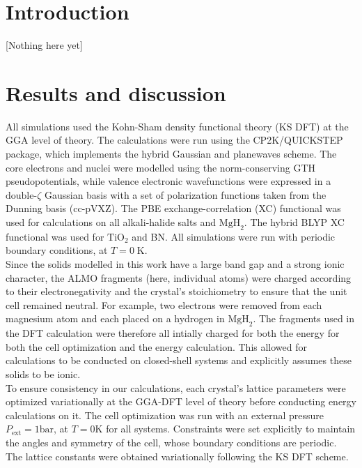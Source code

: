 \documentclass[aps,prb,twocolumn,amsmath,amssymb,superscriptaddress,longbibliography]{revtex4-1}
\begin{document}
\section{Introduction} 

[Nothing here yet]



\section*{Results and discussion}
 
All simulations used the Kohn-Sham density functional theory (KS DFT) at the GGA level of theory. 
The calculations were run using the CP2K/QUICKSTEP package\cite{cp2k}, which implements the hybrid Gaussian and planewaves scheme\cite{gpw}. 
The core electrons and nuclei were modelled using the norm-conserving GTH pseudopotentials\cite{gth1,gth2}, while valence electronic wavefunctions were expressed in a $\text{double-}\zeta$  Gaussian basis \cite{gaussian} with a set of polarization functions taken from the Dunning basis (cc-pVXZ)\cite{pol,qs}.
The PBE exchange-correlation (XC) functional\cite{pbe} was used for calculations on all alkali-halide salts and $\text{MgH}_{2}$. 
The hybrid BLYP XC functional\cite{becke,lyp} was used for $\text{TiO}_{2}$ and BN. 
All simulations were run with periodic boundary conditions, at $T = 0\;\text{K}$.\\

Since the solids modelled in this work have a large band gap and a strong ionic character, the ALMO fragments (here, individual atoms) were charged according to their electronegativity and the crystal's stoichiometry to ensure that the unit cell remained neutral. 
For example, two electrons were removed from each magnesium atom and each placed on a hydrogen in $\text{MgH}_{2}$. 
The fragments used in the DFT calculation were therefore all intially charged for both the energy for both the cell optimization and the energy calculation.
This allowed for calculations to be conducted on closed-shell systems and explicitly assumes these solids to be ionic.\\  


To ensure consistency in our calculations, each crystal's lattice parameters were optimized variationally at the GGA-DFT level of theory before conducting energy calculations on it. 
The cell optimization was run with an external pressure $P_{\text{ext}} = 1 \text{bar}$, at $T = 0 \text{K}$ for all systems. 
Constraints were set explicitly to maintain the angles and symmetry of the cell, whose boundary conditions are periodic. 
The lattice constants were obtained variationally following the KS DFT scheme.\\ 
\end{document}
